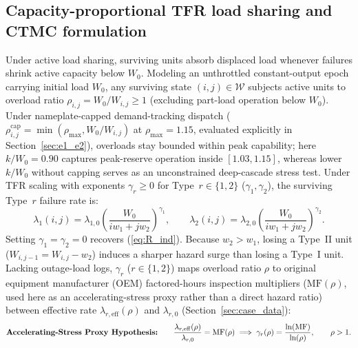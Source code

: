 \documentclass{elektr}
\begin{document}
\subsection{Capacity-proportional TFR load sharing and CTMC formulation}
Under active load sharing, surviving units absorb displaced load whenever failures shrink active capacity below $W_0$. Modeling an unthrottled constant-output epoch carrying initial load $W_0$, any surviving state $(i, j) \in \mathcal{W}$ subjects active units to overload ratio $\rho_{i,j} = W_0 / W_{i,j} \ge 1$ (excluding part-load operation below $W_0$). Under nameplate-capped demand-tracking dispatch ($\rho_{i,j}^{\mathrm{cap}} = \min(\rho_{\max}, W_0/W_{i,j})$ at $\rho_{\max} = 1.15$, evaluated explicitly in Section~\ref{sec:e1_e2}), overloads stay bounded within peak capability; here $k/W_0 = 0.90$ captures peak-reserve operation inside $[1.03, 1.15]$, whereas lower $k/W_0$ without capping serves as an unconstrained deep-cascade stress test. Under TFR scaling with exponents $\gamma_r \ge 0$ for Type~$r \in \{1, 2\}$ ($\gamma_1, \gamma_2$), the surviving Type~$r$ failure rate is:
\begin{equation}
\lambda_1(i, j) = \lambda_{1,0} \left( \frac{W_0}{i w_1 + j w_2} \right)^{\gamma_1}, \qquad \lambda_2(i, j) = \lambda_{2,0} \left( \frac{W_0}{i w_1 + j w_2} \right)^{\gamma_2}.
\label{eq:lam12}
\end{equation}
Setting $\gamma_1 = \gamma_2 = 0$ recovers (\ref{eq:R_ind}). Because $w_2 > w_1$, losing a Type~II unit ($W_{i,j-1} = W_{i,j} - w_2$) induces a sharper hazard surge than losing a Type~I unit. Lacking outage-load logs, $\gamma_r$ ($r \in \{1, 2\}$) maps overload ratio $\rho$ to original equipment manufacturer (OEM) factored-hours inspection multipliers ($\mathrm{MF}(\rho)$, used here as an accelerating-stress proxy rather than a direct hazard ratio) between effective rate $\lambda_{r,\mathrm{eff}}(\rho)$ and $\lambda_{r,0}$ (Section~\ref{sec:case_data}):
\begin{equation}
\text{\textbf{Accelerating-Stress Proxy Hypothesis:}} \qquad \frac{\lambda_{r,\mathrm{eff}}(\rho)}{\lambda_{r,0}} = \mathrm{MF}(\rho) \implies \gamma_r(\rho) = \frac{\ln(\mathrm{MF})}{\ln(\rho)}, \qquad \rho > 1.
\label{eq:proxy_hyp}
\end{equation}
\end{document}
